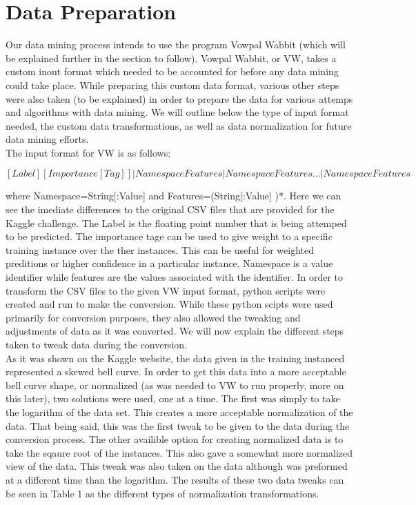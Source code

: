 \section{Data Preparation}

Our data mining process intends to use the program Vowpal Wabbit (which will be explained further in the section to follow). Vowpal Wabbit,
or VW, takes a custom inout format which needed to be accounted for before any data mining could take place. While preparing this custom
data format, various other steps were also taken (to be explained) in order to prepare the data for various attemps and algorithms with
data mining. We will outline below the type of input format needed, the custom data transformations, as well as data normalization for
future data mining efforts.\\

The input format for VW is as follows:

\begin{equation}
\label{eq:input}
[Label] [Importance [Tag]]|Namespace Features |Namespace Features ... |Namespace Features
\end{equation}

where Namespace=String[:Value] and Features=(String[:Value] )*. Here we can see the imediate differences to the original CSV files that
are provided for the Kaggle challenge. The Label is the floating point number that is being attemped to be predicted. The importance
tage can be used to give weight to a specific training instance over the ther instances. This can be useful for weighted preditions
or higher confidence in a particular instance. Namespace is a value identifier while features are the values associated with the identifier.
In order to transform the CSV files to the given VW input format, python scripts were created and run to make the conversion. While
these python scipts were used primarily for conversion purposes, they also allowed the tweaking and adjustments of data as it was converted.
We will now explain the different steps taken to tweak data during the conversion.\\

As it was shown on the Kaggle website, the data given in the training instanced represented a skewed bell curve. In order to get
this data into a more acceptable bell curve shape, or normalized (as was needed to VW to run properly, more on this later), two
solutions were used, one at a time. The first was simply to take the logarithm of the data set. This creates a more acceptable
normalization of the data. That being said, this was the first tweak to be given to the data during the conversion process. The other
availible option for creating normalized data is to take the sqaure root of the instances. This also gave a somewhat more normalized
view of the data. This tweak was also taken on the data although was preformed at a different time than the logarithm. The results
of these two data tweaks can be seen in Table 1 as the different types of normalization transformations.\\

